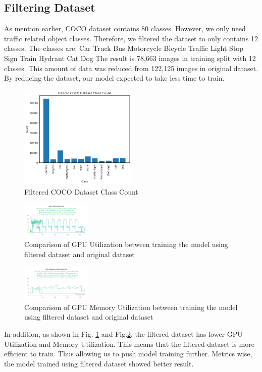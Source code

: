 \documentclass[conference]{IEEEtran}
\begin{document}
\subsection{Filtering Dataset}\label{Filtering}
As mention earlier, COCO dataset contains 80 classes. However, we only need traffic related object classes.
Therefore, we filtered the dataset to only contains 12 classes. The classes are:
Car Truck Bus Motorcycle Bicycle Traffic Light Stop Sign Train Hydrant Cat Dog
The result is 78,663 images in training split with 12 classes. This amount of data was reduced from 122,125 images in original dataset. By reducing the dataset, our model expected to take less time to train.
\begin{figure}[h!]
\centering
\includegraphics[width=0.5\textwidth,keepaspectratio]{filtered_coco_class_count.png}
\caption{Filtered COCO Dataset Class Count}
\end{figure}

\begin{figure}[h!]
\centering
\includegraphics[width=0.3\textwidth,keepaspectratio]{gpu_utilization_comparison_original_and_filtered.png}
\caption{Comparison of GPU Utilization between training the model using filtered dataset and original dataset}
\label{fig:original_filtered_gpu_utilization}
\end{figure}

\begin{figure}[h!]
\centering
\includegraphics[width=0.3\textwidth,keepaspectratio]{memory_utilization_comparison_original_and_filtered.png}
\caption{Comparison of GPU Memory Utilization between training the model using filtered dataset and original dataset}
\label{fig:original_filtered_memory_utilization}
\end{figure}
In addition, as shown in Fig. \ref{fig:original_filtered_gpu_utilization} and Fig.\ref{fig:original_filtered_memory_utilization}, the filtered dataset has lower GPU Utilization and Memory Utilization. This means that the filtered dataset is more efficient to train.
Thus allowing us to push model training further.
Metrics wise, the model trained using filtered dataset showed better result.
\end{document}

